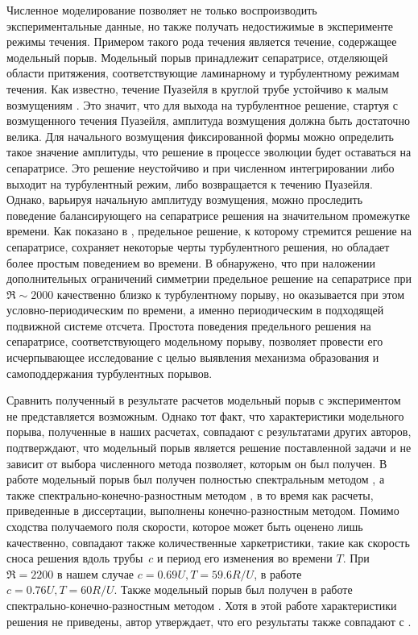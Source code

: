 Численное моделирование позволяет не только воспроизводить экспериментальные данные, но также получать недостижимые в эксперименте режимы течения. Примером такого рода течения является течение, содержащее модельный порыв. Модельный порыв принадлежит сепаратрисе, отделяющей области притяжения, соответствующие ламинарному и турбулентному режимам течения. Как известно, течение Пуазейля в круглой трубе устойчиво к малым возмущениям \cite{Kerswell2005}. Это значит, что для выхода на турбулентное решение, стартуя с возмущенного течения Пуазейля, амплитуда возмущения должна быть достаточно велика. Для начального возмущения фиксированной формы можно определить такое значение амплитуды, что решение в процессе эволюции будет оставаться на сепаратрисе. Это решение неустойчиво и при численном интегрировании либо выходит на турбулентный режим, либо возвращается к течению Пуазейля. Однако, варьируя начальную амплитуду возмущения, можно проследить поведение балансирующего на сепаратрисе решения на значительном промежутке времени. Как показано в \cite{Skufca2006}, предельное решение, к которому стремится решение на сепаратрисе, сохраняет некоторые черты турбулентного решения, но обладает более простым поведением во времени. В \cite{Avila2013} обнаружено, что при наложении дополнительных ограничений симметрии предельное решение на сепаратрисе при $\Re \sim 2000$ качественно близко к турбулентному порыву, но оказывается при этом условно-периодическим по времени, а именно периодическим в подходящей подвижной системе отсчета. Простота поведения предельного решения на сепаратрисе, соответствующего модельному порыву, позволяет провести его исчерпывающее исследование с целью выявления механизма образования и самоподдержания турбулентных порывов.

Сравнить полученный в результате расчетов модельный порыв с экспериментом не представляется возможным. Однако тот факт, что характеристики модельного порыва, полученные в наших расчетах, совпадают с результатами других авторов, подтверждают, что модельный порыв является решение поставленной задачи и не зависит от выбора численного метода позволяет, которым он был получен. В работе \cite{Avila2013} модельный порыв был получен полностью спектральным методом \cite{Meseguer2007}, а также спектрально-конечно-разностным методом \cite{Willis2009}, в то время как расчеты, приведенные в диссертации, выполнены конечно-разностным методом. Помимо сходства получаемого поля скорости, которое может быть оценено лишь качественно, совпадают также количественные харкетристики, такие как скорость сноса решения вдоль трубы~$c$ и период его изменения во времени $T$. При $\Re = 2200$ в нашем случае $c = 0.69U, T = 59.6 R/U$, в работе \cite{Avila2013} $c = 0.76U, T = 60R/U$. Также модельный порыв был получен в работе \cite{Chantry2014} спектрально-конечно-разностным методом \cite{Willis2009}. Хотя в этой работе характеристики решения не приведены, автор утверждает, что его результаты также совпадают с \cite{Avila2013}. 

